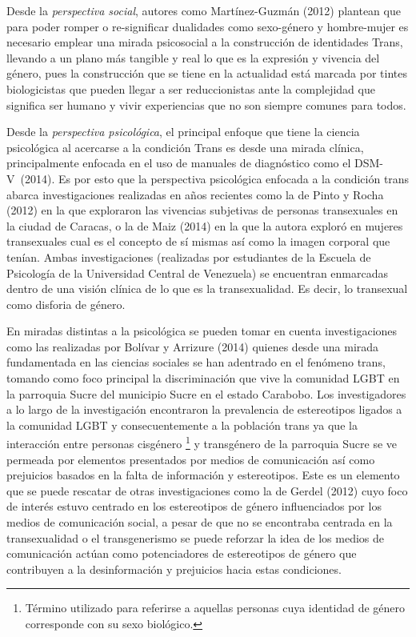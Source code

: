 Desde la \emph{perspectiva social}, autores como Martínez-Guzmán (2012) plantean que
para poder romper o re-significar dualidades como sexo-género y hombre-mujer es
necesario emplear una mirada psicosocial a la construcción de identidades Trans,
llevando a un plano más tangible y real lo que es la expresión y vivencia del
género, pues la construcción que se tiene en la actualidad está marcada por
tintes biologicistas que pueden llegar a ser reduccionistas ante la complejidad
que significa ser humano y vivir experiencias que no son siempre comunes para
todos.

Desde la \emph{perspectiva psicológica}, el principal enfoque que tiene la
ciencia psicológica al acercarse a la condición Trans es desde una mirada
clínica, principalmente enfocada en el uso de manuales de diagnóstico como el
DSM-V~(2014).
Es por esto que la perspectiva psicológica enfocada a la condición trans abarca
investigaciones realizadas en años recientes como la de Pinto y Rocha (2012) en
la que exploraron las vivencias subjetivas de personas transexuales en la ciudad
de Caracas, o la de Maiz (2014) en la que la autora exploró en mujeres
transexuales cual es el concepto de sí mismas así como la imagen corporal que
tenían.
Ambas investigaciones (realizadas por estudiantes de la Escuela de Psicología de
la Universidad Central de Venezuela) se encuentran enmarcadas dentro de una
visión clínica de lo que es la transexualidad.
Es decir, lo transexual como disforia de género.

En miradas distintas a la psicológica se pueden tomar en cuenta investigaciones
como las realizadas por Bolívar y Arrizure (2014) quienes desde una mirada
fundamentada en las ciencias sociales se han adentrado en el fenómeno trans,
tomando como foco principal la discriminación que vive la comunidad LGBT en la
parroquia Sucre del municipio Sucre en el estado Carabobo.
Los investigadores a lo largo de la investigación encontraron la prevalencia de
estereotipos ligados a la comunidad LGBT y consecuentemente a la población trans
ya que la interacción entre personas cisgénero
\footnote{Término utilizado para referirse a aquellas personas cuya identidad
de género corresponde con su sexo biológico.}
y transgénero de la parroquia
Sucre se ve permeada por elementos presentados por medios de comunicación así
como prejuicios basados en la falta de información y estereotipos.
Este es un elemento que se puede rescatar de otras investigaciones como la de
Gerdel (2012) cuyo foco de interés estuvo centrado en los estereotipos de género
influenciados por los medios de comunicación social, a pesar de que no se
encontraba centrada en la transexualidad o el transgenerismo se puede reforzar
la idea de los medios de comunicación actúan como potenciadores de estereotipos
de género que contribuyen a la desinformación y prejuicios hacia estas
condiciones.

